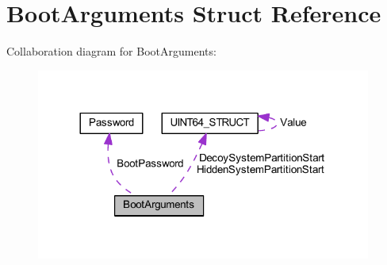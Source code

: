 \hypertarget{struct_boot_arguments}{}\section{Boot\+Arguments Struct Reference}
\label{struct_boot_arguments}


Collaboration diagram for Boot\+Arguments\+:
\nopagebreak
\begin{figure}[H]
\begin{center}
\leavevmode
\includegraphics[width=312pt]{struct_boot_arguments__coll__graph}
\end{center}
\end{figure}
